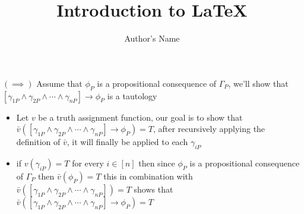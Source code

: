 \documentclass{article}
\begin{document}
\title{Introduction to \LaTeX{}}
\author{Author's Name}

\maketitle

$\left( \implies \right)$ 
Assume that $\phi _{P}$ is a propositional consequence of $\Gamma_{P}$, we'll show that $\left[ \gamma_{1P} \land \gamma_{2P}\land \dotsb \land \gamma_{nP} \right] \to \phi _{P}$ is a tautology 

\begin{itemize}
  \item Let $v$ be a truth assignment function, our goal is to show that $\bar{v}\left(\left[ \gamma_{1P} \land \gamma_{2P}\land \dotsb \land \gamma_{nP} \right] \to \phi _{P}\right) = T$, after recursively applying the definition of $\bar{v}$, it will finally be applied to each $\gamma_{iP}$ 
  \item if $v\left(\gamma_{iP}\right)=T$ for every $i \in \left[ n \right]$ then since $\phi _{P}$ is a propositional consequence of $\Gamma_{P}$ then $\bar{v}\left(\phi _{P}\right)=T$ this in combination with  $\bar{v}\left(\left[ \gamma_{1P} \land \gamma_{2P}\land \dotsb \land \gamma_{nP} \right]\right)=T$ shows that $\bar{v}\left(\left[ \gamma_{1P} \land \gamma_{2P}\land \dotsb \land \gamma_{nP} \right] \to \phi _{P}\right) = T$
\end{itemize}
\end{document}
